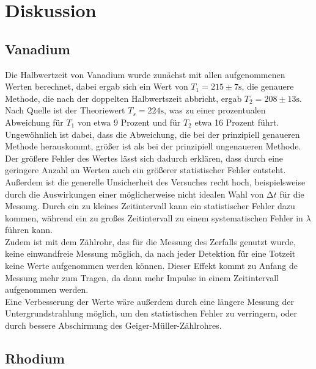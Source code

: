\section{Diskussion}
\label{sec:Diskussion}

\subsection{Vanadium}

Die Halbwertzeit von Vanadium wurde zunächst mit allen aufgenommenen Werten berechnet, dabei ergab sich ein Wert
von $T_1 = 215 \pm 7 \si{\s}$, die genauere Methode, die nach der doppelten Halbwertszeit abbricht, ergab 
$T_2 = 208 \pm 13 \si{\s}$. Nach Quelle %
ist der Theoriewert $T_s = 224 \si{\s}$, was zu einer prozentualen Abweichung für $T_1$ von etwa 9 Prozent und für 
$T_2$ etwa 16 Prozent führt. Ungewöhnlich ist dabei, dass die Abweichung, die bei der prinzipiell genaueren Methode herauskommt,
größer ist als bei der prinzipiell ungenaueren Methode. 
Der größere Fehler des Wertes lässt sich dadurch erklären, dass durch eine geringere Anzahl an Werten auch ein größerer statistischer Fehler entsteht. 
Außerdem ist die generelle Unsicherheit des Versuches recht hoch, beispielsweise durch die Auswirkungen einer möglicherweise nicht idealen Wahl von $\increment t$
für die Messung. Durch ein zu kleines Zeitintervall kann ein statistischer Fehler dazu kommen, während ein zu großes Zeitintervall zu einem systematischen Fehler in 
$\lambda$ führen kann. \\
Zudem ist mit dem Zählrohr, das für die Messung des Zerfalls genutzt wurde, keine einwandfreie Messung möglich, da nach jeder Detektion für eine Totzeit keine Werte 
aufgenommen werden können. Dieser Effekt kommt zu Anfang de Messung mehr zum Tragen, da dann mehr Impulse in einem Zeitintervall aufgenommen werden.\\
Eine Verbesserung der Werte wäre außerdem durch eine längere Messung der Untergrundstrahlung möglich, um den statistischen Fehler zu verringern, oder durch bessere Abschirmung
des Geiger-Müller-Zählrohres.

\subsection{Rhodium}

